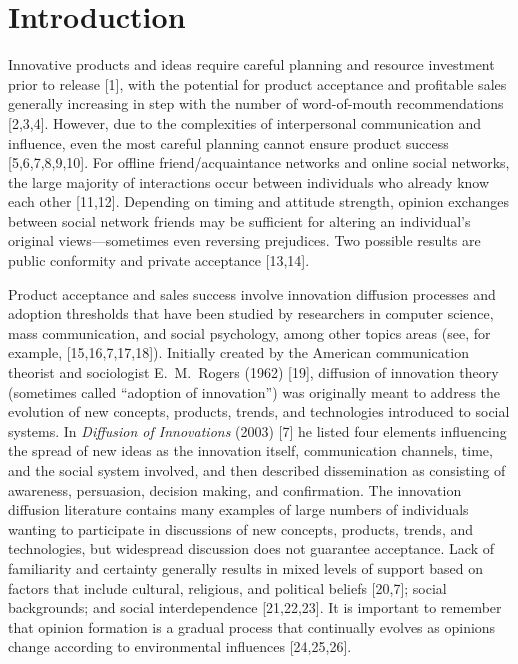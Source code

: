 \documentclass[10pt,letterpaper]{article}
\begin{document}
\section*{Introduction}

Innovative products and ideas require careful planning and resource investment prior to release [1], with the potential for product acceptance and profitable sales generally increasing in step with the number of word-of-mouth recommendations [2,3,4]. However, due to the complexities of interpersonal communication and influence, even the most careful planning cannot ensure product success [5,6,7,8,9,10]. For offline friend/acquaintance networks and online social networks, the large majority of interactions occur between individuals who already know each other [11,12]. Depending on timing and attitude strength, opinion exchanges between social network friends may be sufficient for altering an individual's original views---sometimes even reversing prejudices. Two possible results are public conformity and private acceptance [13,14].

Product acceptance and sales success involve innovation diffusion processes and adoption thresholds that have been studied by researchers in computer science, mass communication, and social psychology, among other topics areas (see, for example, [15,16,7,17,18]). Initially created by the American communication theorist and sociologist E.~M.~Rogers (1962) [19], diffusion of innovation theory (sometimes called ``adoption of innovation'') was originally meant to address the evolution of new concepts, products, trends, and technologies introduced to social systems. In \textit{Diffusion of Innovations} (2003) [7] he listed four elements influencing the spread of new ideas as the innovation itself, communication channels, time, and the social system involved, and then described dissemination as consisting of awareness, persuasion, decision making, and confirmation. The innovation diffusion literature contains many examples of large numbers of individuals wanting to participate in discussions of new concepts, products, trends, and technologies, but widespread discussion does not guarantee acceptance. Lack of familiarity and certainty generally results in mixed levels of support based on factors that include cultural, religious, and political beliefs [20,7]; social backgrounds; and social interdependence [21,22,23]. It is important to remember that opinion formation is a gradual process that continually evolves as opinions change according to environmental influences [24,25,26].
\end{document}
